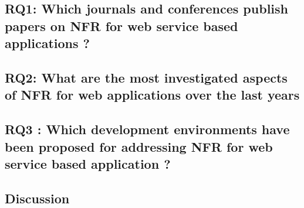 
\subsection{RQ1: Which journals and conferences publish papers on NFR for web service based applications ?}

\subsection{RQ2: What are the most investigated aspects of NFR for web applications over the last years}

\subsection{RQ3 : Which development environments have been proposed for addressing NFR for web service based application ?}

\subsection{Discussion}